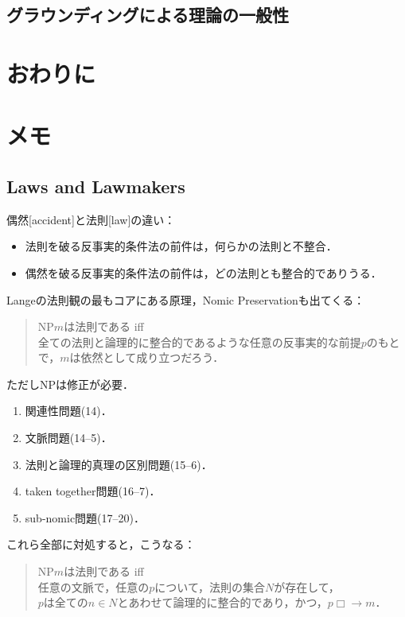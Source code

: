\documentclass[dvipdfmx,twoside,11pt,uplatex]{jsarticle}
\theoremstyle{definition}
\begin{document}
\subsection{グラウンディングによる理論の一般性}


\section{おわりに}

\section{メモ}
\cite{Lange2009a,Lange2009b,Lange2010,Lange2011,Lange2012,Lange2013a,Lange2013b,Lange2013c,Lange2014,Lange2015,Lange2016,Lange2018a,Lange2018b}

\subsection{Laws and Lawmakers}
偶然[accident]と法則[law]の違い\citep[13]{Lange2009lawmakers}：
\begin{itemize}
    \item 法則を破る反事実的条件法の前件は，何らかの法則と不整合．
    \item 偶然を破る反事実的条件法の前件は，どの法則とも整合的でありうる．
\end{itemize}

Langeの法則観の最もコアにある原理，Nomic Preservationも出てくる\citep[13]{Lange2009lawmakers}：
\begin{quote}
    NP\quad $m$は法則である iff\\
    全ての法則と論理的に整合的であるような任意の反事実的な前提$p$のもとで，$m$は依然として成り立つだろう．
\end{quote}
ただしNPは修正が必要．
\begin{enumerate}
    \item 関連性問題(14)．
    \item 文脈問題(14--5)．
    \item 法則と論理的真理の区別問題(15--6)．
    \item taken together問題(16--7)．
    \item sub-nomic問題(17--20)．
\end{enumerate}
これら全部に対処すると，こうなる\citep[20]{Lange2009lawmakers}：
\begin{quote}
    NP\quad $m$は法則である iff \\
    任意の文脈で，任意の$p$について，法則の集合$N$が存在して，\\
    $p$は全ての$n\in N$とあわせて論理的に整合的であり，かつ，$p\Box\rightarrow m$．
\end{quote}
\end{document}
